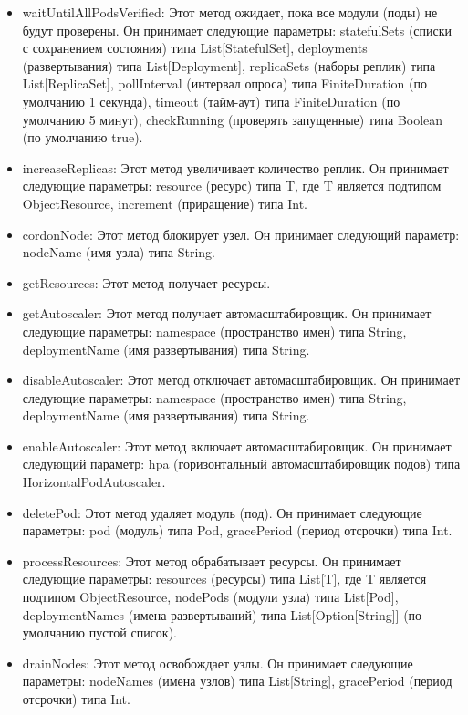   \begin{itemize}
  \item waitUntilAllPodsVerified: Этот метод ожидает, пока все модули (поды) не
будут проверены. Он принимает следующие параметры: statefulSets (списки с
сохранением состояния) типа List[StatefulSet], deployments (развертывания) типа
List[Deployment], replicaSets (наборы реплик) типа List[ReplicaSet],
pollInterval (интервал опроса) типа FiniteDuration (по умолчанию 1 секунда),
timeout (тайм-аут) типа FiniteDuration (по умолчанию 5 минут), checkRunning
(проверять запущенные) типа Boolean (по умолчанию true).
  
  \item increaseReplicas: Этот метод увеличивает количество реплик. Он принимает
следующие параметры: resource (ресурс) типа T, где T является подтипом
ObjectResource, increment (приращение) типа Int.
  
  \item cordonNode: Этот метод блокирует узел. Он принимает следующий параметр:
nodeName (имя узла) типа String.
  
  \item getResources: Этот метод получает ресурсы.
  
  \item getAutoscaler: Этот метод получает автомасштабировщик. Он принимает
следующие параметры: namespace (пространство имен) типа String, deploymentName
(имя развертывания) типа String.
  
  \item disableAutoscaler: Этот метод отключает автомасштабировщик. Он принимает
следующие параметры: namespace (пространство имен) типа String, deploymentName
(имя развертывания) типа String.
  
  \item enableAutoscaler: Этот метод включает автомасштабировщик. Он принимает
следующий параметр: hpa (горизонтальный автомасштабировщик подов) типа
HorizontalPodAutoscaler.
  
  \item deletePod: Этот метод удаляет модуль (под). Он принимает следующие
параметры: pod (модуль) типа Pod, gracePeriod (период отсрочки) типа Int.
  
  \item processResources: Этот метод обрабатывает ресурсы. Он принимает
следующие параметры: resources (ресурсы) типа List[T], где T является подтипом
ObjectResource, nodePods (модули узла) типа List[Pod], deploymentNames (имена
развертываний) типа List[Option[String]] (по умолчанию пустой список).
  
  \item drainNodes: Этот метод освобождает узлы. Он принимает следующие
параметры: nodeNames (имена узлов) типа List[String], gracePeriod (период
отсрочки) типа Int.
  \end{itemize}
  
